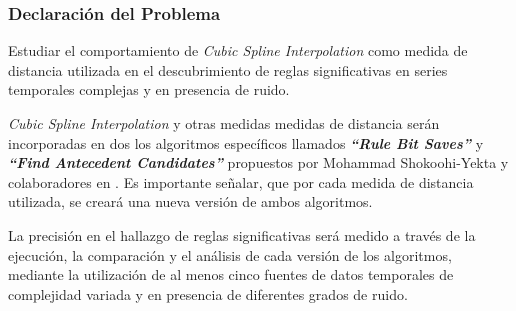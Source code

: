 \subsubsection{Declaraci\'on del Problema}
Estudiar el comportamiento de \textit{Cubic Spline Interpolation} como medida de distancia utilizada en el descubrimiento de reglas significativas en series temporales complejas y en presencia de ruido.\par
\textit{Cubic Spline Interpolation} y otras medidas medidas de distancia ser\'an incorporadas en dos los algoritmos espec\'ificos llamados \textit{\textbf{\enquote{Rule Bit Saves}}} y \textit{\textbf{\enquote{Find Antecedent Candidates}}} propuestos por Mohammad Shokoohi-Yekta y colaboradores en \cite{main}. Es importante se\~nalar, que por cada medida de distancia utilizada, se crear\'a una nueva versi\'on de ambos algoritmos.\par
La precisi\'on en el hallazgo de reglas significativas ser\'a medido a trav\'es de la ejecuci\'on, la comparaci\'on y el an\'alisis de cada versi\'on de los algoritmos, mediante la utilizaci\'on de al menos cinco fuentes de datos temporales de complejidad variada y en presencia de diferentes grados de ruido.
